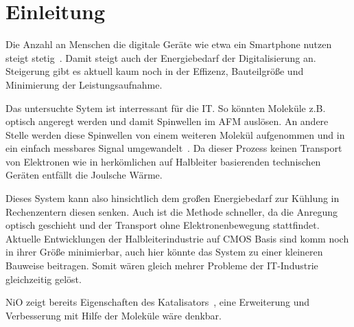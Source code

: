 \chapter{Einleitung}
    Die Anzahl an Menschen die digitale Geräte wie etwa ein Smartphone nutzen steigt stetig~\cite{Statista}.
    Damit steigt auch der Energiebedarf der Digitalisierung an.
    Steigerung gibt es aktuell kaum noch in der Effizenz, Bauteilgröße und Minimierung der Leistungsaufnahme.

    Das untersuchte Sytem ist interressant für die IT.
    So könnten Moleküle z.B. optisch angeregt werden und damit Spinwellen im AFM auslösen. 
    An andere Stelle werden diese Spinwellen von einem weiteren Molekül aufgenommen und in ein einfach messbares Signal umgewandelt~\cite{SINFONIA}.
    Da dieser Prozess keinen Transport von Elektronen wie in herkömlichen auf Halbleiter basierenden technischen Geräten entfällt die Joulsche Wärme.

    Dieses System kann also hinsichtlich dem großen Energiebedarf zur Kühlung in Rechenzentern diesen senken.
    Auch ist die Methode schneller, da die Anregung optisch geschieht und der Transport ohne Elektronenbewegung stattfindet.
    Aktuelle Entwicklungen der Halbleiterindustrie auf CMOS Basis sind komm noch in ihrer Größe minimierbar, auch hier könnte das System zu einer kleineren Bauweise beitragen. 
    Somit wären gleich mehrer Probleme der IT-Industrie gleichzeitig gelöst.

    NiO zeigt bereits Eigenschaften des Katalisators~\cite{kunz_chemisorption_1985}, eine Erweiterung und Verbesserung mit Hilfe der Moleküle wäre denkbar.
